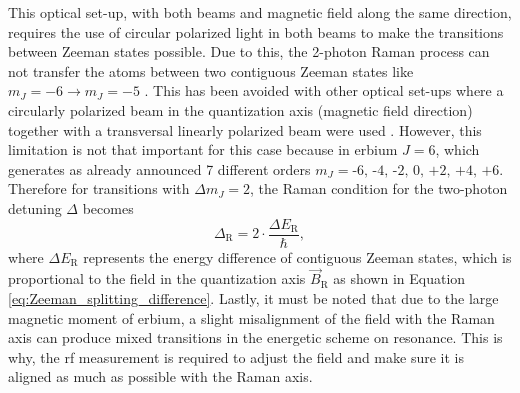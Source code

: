 This optical set-up, with both beams and magnetic field along the same direction, requires the use of circular polarized light in both beams to make the transitions between Zeeman states possible. Due to this, the 2-photon Raman process can not transfer the atoms between two contiguous Zeeman states like $m_J=-6 \rightarrow m_J=-5$ \cite{Foot2005}. This has been avoided with other optical set-ups where a circularly polarized beam in the quantization axis (magnetic field direction) together with a transversal linearly polarized beam were used \cite{Debs2009}. However, this limitation is not that important for this case because in erbium $J=6$, which generates as already announced 7 different orders $m_J = \text{-6, -4, -2, 0, +2, +4, +6}$. Therefore for transitions with $\Delta m_{J} = 2$, the Raman condition for the two-photon detuning $\Delta$ becomes
\begin{equation}\label{eq:raman_condition}
	\Delta_\text{R} = 2\cdot\frac{\Delta E_\text{R}}{\hbar},
\end{equation}
where $\Delta E_\text{R}$ represents the energy difference of contiguous Zeeman states, which is proportional to the field in the quantization axis $\vec{B}_\text{R}$ as shown in Equation \ref{eq:Zeeman_splitting_difference}. Lastly, it must be noted that due to the large magnetic moment of erbium, a slight misalignment of the field with the Raman axis can produce mixed transitions in the energetic scheme on resonance. This is why, the \ac{rf} measurement is required to adjust the field and make sure it is aligned as much as possible with the Raman axis. %

